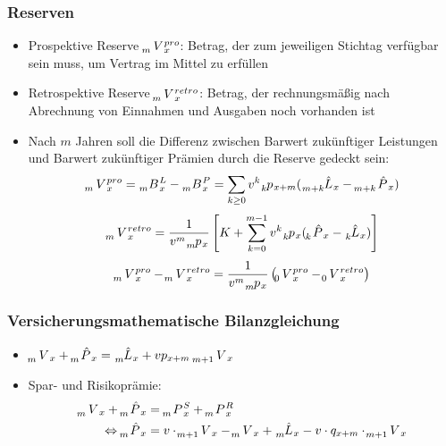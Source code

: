 \documentclass[12pt]{report}
\theoremstyle{dotless}
\theoremstyle{definition}
\begin{document}
\subsubsection{Reserven}
\begin{itemize}
	\item Prospektive Reserve $\tensor[_{m}]{V}{}_x^{pro}$: Betrag, der zum jeweiligen Stichtag verfügbar sein muss, um Vertrag im Mittel zu erfüllen
	\item Retrospektive Reserve $\tensor[_{m}]{V}{}_x^{retro}$: Betrag, der rechnungsmäßig nach Abrechnung von Einnahmen und Ausgaben noch vorhanden ist
	\item Nach $m$ Jahren soll die Differenz zwischen Barwert zukünftiger Leistungen und Barwert zukünftiger Prämien durch die Reserve gedeckt sein: 
	\begin{equation}
		\tensor[_{m}]{V}{}_x^{pro} = \tensor[_{m}]{B}{}_x^{L} - \tensor[_{m}]{B}{}_x^{P} = \sum_{k \geq 0} v^k \tensor[_{k}]{p}{}_{x+m}(\tensor[_{m+k}]{\hat{L}}{}_x - \tensor[_{m+k}]{\hat{P}}{}_x)
	\end{equation}
	\begin{equation}
		\tensor[_{m}]{V}{}_x^{retro} = \frac{1}{v^m \tensor[_{m}]{p}{}_x} \left[K+\sum_{k=0}^{m-1}v^k \tensor[_{k}]{p}{}_x (\tensor[_{k}]{\hat{P}}{}_x - \tensor[_{k}]{\hat{L}}{}_x) \right]
	\end{equation}
	\begin{equation}
		\tensor[_{m}]{V}{}_x^{pro} - \tensor[_{m}]{V}{}_x^{retro} = \frac{1}{v^m \tensor[_{m}]{p}{}_x} \left(\tensor[_{0}]{V}{}_x^{pro} - \tensor[_{0}]{V}{}_x^{retro}\right)
	\end{equation}
\end{itemize}

\subsubsection{Versicherungsmathematische Bilanzgleichung}
\begin{itemize}
	\item $\tensor[_{m}]{V}{}_x + \tensor[_{m}]{\hat{P}}{}_x = \tensor[_{m}]{\hat{L}}{}_x + vp_{x+m} \ \tensor[_{m+1}]{V}{}_x$
	\item Spar- und Risikoprämie: 
		\begin{align}
			\tensor[_{m}]{V}{}_x + \tensor[_{m}]{\hat{P}}{}_x &= \tensor[_{m}]{P}{}_x^S + \tensor[_{m}]{P}{}_x^R \\
			\Leftrightarrow \tensor[_{m}]{\hat{P}}{}_x &= v \cdot \tensor[_{m+1}]{V}{}_x - \tensor[_{m}]{V}{}_x + \tensor[_{m}]{\hat{L}}{}_x - v \cdot q_{x+m} \cdot \tensor[_{m+1}]{V}{}_x
		\end{align}
\end{itemize}
\end{document}
